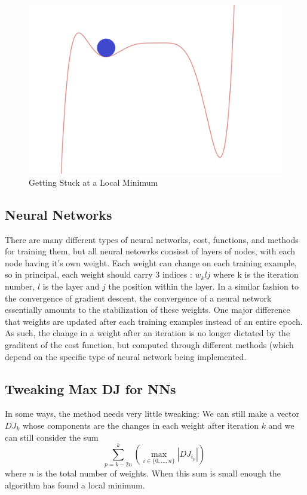 \documentclass[11pt]{article} %
\begin{document}
\begin{figure}
 \begin{center}
\includegraphics[scale=.3]{fcsml1.png}
\end{center}
\caption{Getting Stuck at a Local Minimum}
\end{figure}

\subsection{Neural Networks}
There are many different types of neural networks, cost, functions, and methods for training them, but all neural netowrks consisst of layers of nodes, with each node having it's own weight. Each weight can change on each training example, so in principal, each weight should carry 3 indices : $w_{k}{lj}$ where k is the iteration number, $l$ is the layer and $j$ the position within the layer.   In a similar fashion to the convergence of gradient descent, the convergence of a neural network essentially amounts to the stabilization of these weights.  One major difference that weights are updated after each training examples instead of an entire epoch.  As such, the change in a weight after an iteration is no longer dictated by the graditent of the cost function, but computed through different methods (which depend on the specific type of neural network being implemented. 

\subsection{Tweaking Max DJ for NNs}
In some ways, the method needs very little tweaking: We can still make a vector $DJ_{k}$ whose components are the changes in each weight after iteration $k$ and we can still consider the sum 
$$\sum_{p=k-2n}^{k} \left( \max_{i \in \{0, \dots , n\}} |DJ_{i_{p}}| \right)\ $$
where $n$ is the total number of weights. When this sum is small enough the algorithm has found a local minimum. 
\end{document}

